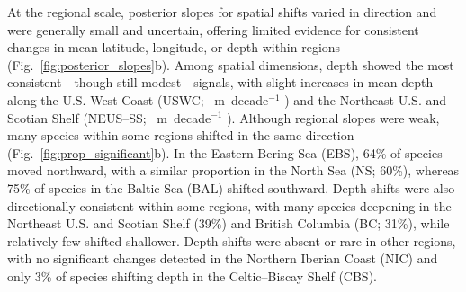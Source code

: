 \documentclass[9pt,twocolumn,twoside]{pnas-new}
\begin{document}




At the regional scale, posterior slopes for spatial shifts varied in direction and were generally small and uncertain, offering limited evidence for consistent changes in mean latitude, longitude, or depth within regions (Fig.~\ref{fig:posterior_slopes}b). Among spatial dimensions, depth showed the most consistent---though still modest---signals, with slight increases in mean depth along the U.S. West Coast (USWC; \DepthUSWCMedian{}~m~decade$^{-1}$ \DepthUSWCCI{}) and the Northeast U.S. and Scotian Shelf (NEUS–SS; \DepthNEUSMedian{}~m~decade$^{-1}$ \DepthNEUSCI{}). Although regional slopes were weak, many species within some regions shifted in the same direction (Fig.~\ref{fig:prop_significant}b). In the Eastern Bering Sea (EBS), 64\% of species moved northward, with a similar proportion in the North Sea (NS; 60\%), whereas 75\% of species in the Baltic Sea (BAL) shifted southward. Depth shifts were also directionally consistent within some regions, with many species deepening in the Northeast U.S. and Scotian Shelf (39\%) and British Columbia (BC; 31\%), while relatively few shifted shallower. Depth shifts were absent or rare in other regions, with no significant changes detected in the Northern Iberian Coast (NIC) and only 3\% of species shifting depth in the Celtic–Biscay Shelf (CBS).
\end{document}
